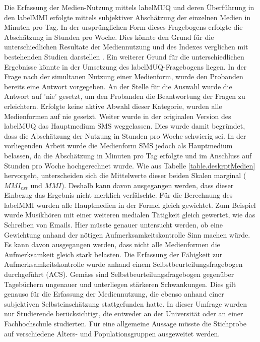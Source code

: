 \label{section.diskussion.methodenkritik}
Die Erfassung der Medien-Nutzung mittels \gls{labelMUQ} und deren Überführung in den \gls{labelMMI} erfolgte mittels subjektiver Abschätzung der einzelnen Medien in Minuten pro Tag. In der ursprünglichen Form dieses Fragebogens erfolgte die Abschätzung in Stunden pro Woche. Dies könnte den Grund für die unterschiedlichen Resultate der Mediennutzung und des Indexes verglichen mit bestehenden Studien darstellen \cite{Ophir2009,Alzahabi2013}. Ein weiterer Grund für die unterschiedlichen Ergebnisse könnte in der Umsetzung des \gls{labelMUQ}-Fragebogens liegen. In der Frage nach der simultanen Nutzung einer Medienform, wurde den Probanden bereits eine Antwort vorgegeben. An der Stelle für die Auswahl wurde die Antwort auf 'nie' gesetzt, um den Probanden die Beantwortung der Fragen zu erleichtern. Erfolgte keine aktive Abwahl dieser Kategorie, wurden alle Medienformen auf nie gesetzt. Weiter wurde in der originalen Version des \gls{labelMUQ} das Hauptmedium SMS weggelassen. Dies wurde damit begründet, dass die Abschätzung der Nutzung in Stunden pro Woche schwierig sei. In der vorliegenden Arbeit wurde die Medienform SMS jedoch als Hauptmedium belassen, da die Abschätzung in Minuten pro Tag erfolgte und im Anschluss auf Stunden pro Woche hochgerechnet wurde. Wie aus Tabelle \ref{table.deskrptMedien} hervorgeht, unterscheiden sich die Mittelwerte dieser beiden Skalen marginal ($MMI_{ext}$ und $MMI$). Deshalb kann davon ausgegangen werden, dass dieser Einbezug das Ergebnis nicht merklich verfälschte. Für die Berechnung des \gls{labelMMI} wurden alle Hauptmedien in der Formel gleich gewichtet. Zum Beispiel wurde Musikhören mit einer weiteren medialen Tätigkeit gleich gewertet, wie das Schreiben von Emails. Hier müsste genauer untersucht werden, ob eine Gewichtung anhand der nötigen Aufmerksamkeitskontrolle Sinn machen würde. Es kann davon ausgegangen werden, dass nicht alle Medienformen die Aufmerksamkeit gleich stark belasten. Die Erfassung der Fähigkeit zur Aufmerksamkeitskontrolle wurde anhand einem Selbstbeurteilungsfragebogen durchgeführt (ACS). Gemäss  sind Selbstbeurteilungsfragebogen gegenüber Tagebüchern ungenauer und unterliegen stärkeren Schwankungen. Dies gilt genauso für die Erfassung der Mediennutzung, die ebenso anhand einer subjektiven Selbsteinschätzung stattgefunden hatte. In dieser Umfrage wurden nur Studierende berücksichtigt, die entweder an der Universität oder an einer Fachhochschule studierten. Für eine allgemeine Aussage müsste die Stichprobe auf verschiedene Alters- und Populationsgruppen ausgeweitet werden. 
